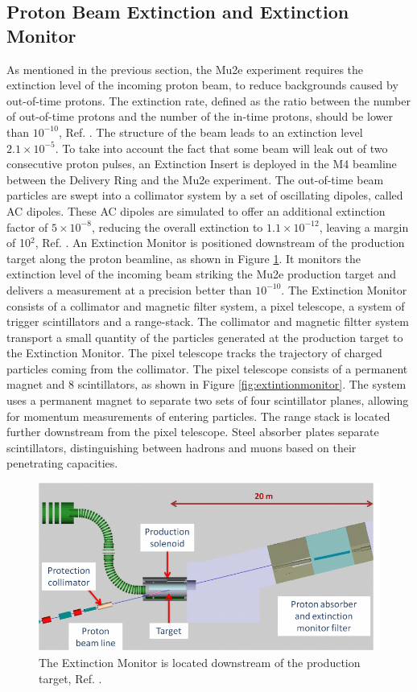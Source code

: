 \subsection{Proton Beam Extinction and Extinction Monitor}
As mentioned in the previous section, the Mu2e experiment requires the extinction level of the incoming proton beam, to reduce backgrounds caused by out-of-time protons. 
The extinction rate, defined as the ratio between the number of out-of-time protons and the number of the in-time protons, should be lower than $10^{-10}$, 
Ref. \cite{bartoszek2015mu2e}. The structure of the beam leads to an extinction level $2.1 \times 10^{-5}$. To take into account the fact that some beam will 
leak out of two consecutive proton pulses, an Extinction Insert is deployed in the M4 beamline between the Delivery Ring and the Mu2e experiment. The out-of-time 
beam particles are swept into a collimator system by a set of oscillating dipoles, called AC dipoles. These AC dipoles are simulated to offer an additional 
extinction factor of $5\times 10^{-8}$, reducing the overall extinction to $1.1 \times 10^{-12}$, leaving a margin of 10$^2$, Ref. \cite{accelerator}. An 
Extinction Monitor is positioned downstream of the production target along the proton beamline, as shown in Figure \ref{fig:extintion}. It monitors the 
extinction level of the incoming beam striking the Mu2e production target and delivers a measurement at a precision better than $10^{-10}$. The Extinction 
Monitor consists of a collimator and magnetic filter system, a pixel telescope, a system of trigger scintillators and a range-stack. The collimator and 
magnetic filtter system transport a small quantity of the particles generated at the production target to the Extinction Monitor. The pixel telescope 
tracks the trajectory of charged particles coming from the collimator. The pixel telescope consists of a permanent magnet and 8 scintillators, as shown 
in Figure \ref{fig:extintionmonitor}. The system uses a permanent magnet to separate two sets of four scintillator planes, allowing for momentum measurements 
of entering particles. The range stack is located further downstream from the pixel telescope. Steel absorber plates separate scintillators, distinguishing 
between hadrons and muons based on their penetrating capacities.
\begin{figure}[!h]
\centering
\includegraphics[width =\textwidth]{figures/png/800px-Extinction_filter.png}
\caption{The Extinction Monitor is located downstream of the
production target, Ref. \cite{Prebys:IPAC2015-THPF121}.}
\label{fig:extintion}
\end{figure}
